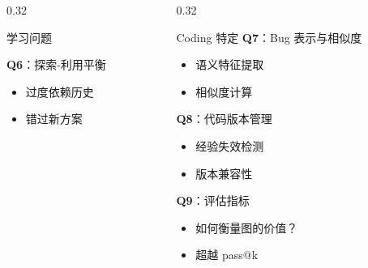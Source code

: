 \documentclass[aspectratio=169,10pt]{beamer}
\begin{document}
\begin{frame}
\begin{columns}[T]
\begin{column}{0.32\textwidth}
\begin{block}{学习问题}
        \vspace{0.2cm}

        \textbf{Q6}：探索-利用平衡
        \begin{itemize}
          \item 过度依赖历史
          \item 错过新方案
        \end{itemize}
      \end{block}
    \end{column}

    \begin{column}{0.32\textwidth}
      \begin{block}{Coding 特定}
        \footnotesize
        \textbf{Q7}：Bug 表示与相似度
        \begin{itemize}
          \item 语义特征提取
          \item 相似度计算
        \end{itemize}

        \vspace{0.2cm}

        \textbf{Q8}：代码版本管理
        \begin{itemize}
          \item 经验失效检测
          \item 版本兼容性
        \end{itemize}

        \vspace{0.2cm}

        \textbf{Q9}：评估指标
        \begin{itemize}
          \item 如何衡量图的价值？
          \item 超越 pass@k
        \end{itemize}
      \end{block}
    \end{column}
  \end{columns}
\end{frame}
\end{document}
